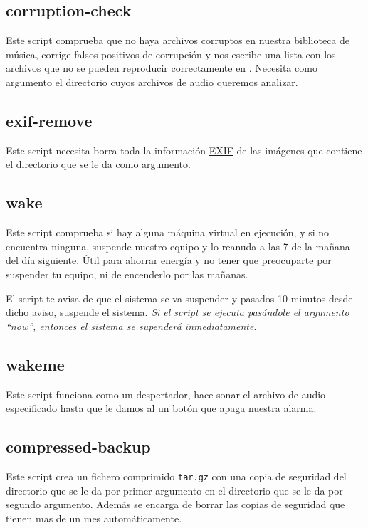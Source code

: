 \documentclass[12pt]{article}
\begin{document}
\subsection{corruption-check}

Este script comprueba que no haya archivos corruptos en nuestra biblioteca de música, corrige falsos positivos de corrupción y nos escribe una lista con los archivos que no se pueden reproducir correctamente en . Necesita como argumento el directorio cuyos archivos de audio queremos analizar.

\subsection{exif-remove}

Este script necesita borra toda la información \href{https://en.wikipedia.org/wiki/Exif}{EXIF} de las imágenes que contiene el directorio que se le da como argumento.

\subsection{wake}

Este script comprueba si hay alguna máquina virtual en ejecución, y si no encuentra ninguna, suspende nuestro equipo y lo reanuda a las 7 de la mañana del día siguiente. Útil para ahorrar energía y no tener que preocuparte por suspender tu equipo, ni de encenderlo por las mañanas.

\medskip
El script te avisa de que el sistema se va suspender y pasados 10 minutos desde dicho aviso, suspende el sistema. \emph{Si el script se ejecuta pasándole el argumento ``now'', entonces el sistema se supenderá inmediatamente}.

\subsection{wakeme}

Este script funciona como un despertador, hace sonar el archivo de audio especificado hasta que le damos al un botón que apaga nuestra alarma.

\subsection{compressed-backup}

Este script crea un fichero comprimido \texttt{tar.gz} con una copia de seguridad del directorio que se le da por primer argumento en el directorio que se le da por segundo argumento. Además se encarga de borrar las copias de seguridad que tienen mas de un mes automáticamente.
\end{document}
